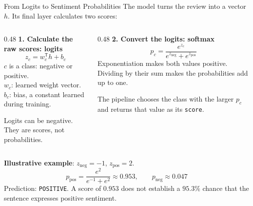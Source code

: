 \documentclass[aspectratio=169]{beamer}
\begin{document}
\begin{frame}{From Logits to Sentiment Probabilities}
  \small
  \setlength{\abovedisplayskip}{4pt}\setlength{\belowdisplayskip}{4pt}
  \setlength{\abovedisplayshortskip}{2pt}\setlength{\belowdisplayshortskip}{4pt}
  The model turns the review into a vector $h$. Its final layer calculates two scores:
  \par\vspace{0.5em}
  \begin{columns}[T,onlytextwidth]
    \begin{column}{0.48\linewidth}
      \textbf{1. Calculate the raw scores: logits}
      \[
        z_c = w_c^{\mathsf T}h + b_c
      \]
      \small $c$ is a class: negative or positive.\\
      $w_c$: learned weight vector.\\
      $b_c$: bias, a constant learned during training.
      \par\vspace{0.4em}
      Logits can be negative. They are scores, not probabilities.
    \end{column}
    \begin{column}{0.48\linewidth}
      \textbf{2. Convert the logits: softmax}
      \[
        p_c = \frac{e^{z_c}}{e^{z_{\mathrm{neg}}}+e^{z_{\mathrm{pos}}}}
      \]
      \small Exponentiation makes both values positive. Dividing by their sum makes the probabilities add up to one.
      \par\vspace{0.4em}
      The pipeline chooses the class with the larger $p_c$ and returns that value as its \texttt{score}.
    \end{column}
  \end{columns}
  \par\vspace{0.2em}
  \textbf{Illustrative example}: $z_{\mathrm{neg}}=-1$, $z_{\mathrm{pos}}=2$.
  \[
    p_{\mathrm{pos}} = \frac{e^2}{e^{-1}+e^2}\approx 0.953,
    \qquad p_{\mathrm{neg}}\approx 0.047
  \]
  \small Prediction: \texttt{POSITIVE}. A score of $0.953$ does not establish a $95.3\%$ chance that the sentence expresses positive sentiment.
\end{frame}
\end{document}
